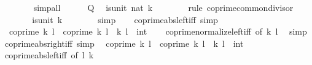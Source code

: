 \begin{isabellebody}
\ \ \ \ \ \ \isamarkupfalse%
\ simp{\isacharunderscore}{\kern0pt}all\isanewline
\ \ \ \ \isamarkupfalse%
\ {\isacartoucheopen}{\isacharquery}{\kern0pt}Q{\isacartoucheclose}\ \isamarkupfalse%
\ {\isachardoublequoteopen}is{\isacharunderscore}{\kern0pt}unit\ {\isacharparenleft}{\kern0pt}nat\ {\isasymbar}k{\isasymbar}{\isacharparenright}{\kern0pt}{\isachardoublequoteclose}\isanewline
\ \ \ \ \ \ \isamarkupfalse%
\ {\isacharparenleft}{\kern0pt}rule\ coprime{\isacharunderscore}{\kern0pt}common{\isacharunderscore}{\kern0pt}divisor{\isacharparenright}{\kern0pt}\isanewline
\ \ \ \ \isamarkupfalse%
\ \isamarkupfalse%
\ {\isachardoublequoteopen}is{\isacharunderscore}{\kern0pt}unit\ k{\isachardoublequoteclose}\isanewline
\ \ \ \ \ \ \isamarkupfalse%
\ simp\isanewline
\ \ \isamarkupfalse%
\isanewline
{}\isamarkupfalse%
%
\endisatagproof
{\isafoldproof}%
%
\isadelimproof
\isanewline
%
\endisadelimproof
\isanewline
{}\isamarkupfalse%
\ coprime{\isacharunderscore}{\kern0pt}abs{\isacharunderscore}{\kern0pt}left{\isacharunderscore}{\kern0pt}iff\ {\isacharbrackleft}{\kern0pt}simp{\isacharbrackright}{\kern0pt}{\isacharcolon}{\kern0pt}\isanewline
\ \ {\isachardoublequoteopen}coprime\ {\isasymbar}k{\isasymbar}\ l\ {\isasymlongleftrightarrow}\ coprime\ k\ l{\isachardoublequoteclose}\ \ k\ l\ {\isacharcolon}{\kern0pt}{\isacharcolon}{\kern0pt}\ int\isanewline
%
\isadelimproof
\ \ %
\endisadelimproof
%
\isatagproof
{}\isamarkupfalse%
\ coprime{\isacharunderscore}{\kern0pt}normalize{\isacharunderscore}{\kern0pt}left{\isacharunderscore}{\kern0pt}iff\ {\isacharbrackleft}{\kern0pt}of\ k\ l{\isacharbrackright}{\kern0pt}\ \isamarkupfalse%
\ simp%
\endisatagproof
{\isafoldproof}%
%
\isadelimproof
\isanewline
%
\endisadelimproof
\isanewline
{}\isamarkupfalse%
\ coprime{\isacharunderscore}{\kern0pt}abs{\isacharunderscore}{\kern0pt}right{\isacharunderscore}{\kern0pt}iff\ {\isacharbrackleft}{\kern0pt}simp{\isacharbrackright}{\kern0pt}{\isacharcolon}{\kern0pt}\isanewline
\ \ {\isachardoublequoteopen}coprime\ k\ {\isasymbar}l{\isasymbar}\ {\isasymlongleftrightarrow}\ coprime\ k\ l{\isachardoublequoteclose}\ \ k\ l\ {\isacharcolon}{\kern0pt}{\isacharcolon}{\kern0pt}\ int\isanewline
%
\isadelimproof
\ \ %
\endisadelimproof
%
\isatagproof
{}\isamarkupfalse%
\ coprime{\isacharunderscore}{\kern0pt}abs{\isacharunderscore}{\kern0pt}left{\isacharunderscore}{\kern0pt}iff\ {\isacharbrackleft}{\kern0pt}of\ l\ k{\isacharbrackright}{\kern0pt}\ \isamarkupfalse%

\end{isabellebody}
